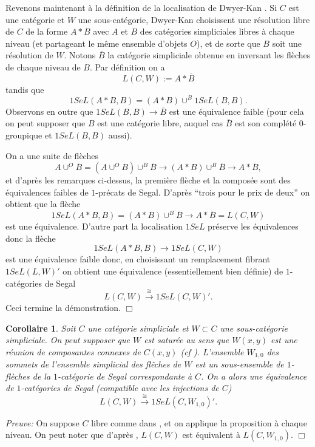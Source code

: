 \documentclass[12pt]{article}
\newcommand{\eop}{\hfill $\Box$\vspace{.1in}}
\newtheorem{corollaire}[lemma]{Corollaire}
\begin{document}
Revenons maintenant \`a la d\'efinition de la localisation de Dwyer-Kan
\cite{DwyerKan1}. Si $C$ est une cat\'egorie et $W$ une sous-cat\'egorie,
Dwyer-Kan choisissent une r\'esolution libre de $C$ de la forme
$A\ast B$ avec $A$ et $B$ des cat\'egories simpliciales libres \`a
chaque niveau
(et partageant le m\^eme ensemble d'objets $O$),
et de sorte que $B$ soit une r\'esolution de $W$. Notons $\overline{B}$
la cat\'egorie simpliciale obtenue en inversant les fl\`eches de chaque
niveau
de $B$. Par d\'efinition on a
$$
L(C,W):= A\ast \overline{B}
$$
tandis que
$$
1SeL(A\ast B, B)= (A\ast B)\cup ^{B}1SeL(B,B).
$$
Observons en outre que $1SeL(B,B)\rightarrow \overline{B}$ est une \'equivalence
faible (pour cela on peut supposer que $B$ est une cat\'egorie libre, auquel cas
$\overline{B}$ est son compl\'et\'e $0$-groupique et $1SeL(B,B)$ aussi).

On
a une suite de fl\`eches $$
A\cup ^O \overline{B} = (A\cup ^OB)\cup ^B\overline{B}\rightarrow
(A\ast B)\cup ^{B}\overline{B}\rightarrow A\ast \overline{B},
$$
et d'apr\`es les remarques ci-dessus,
la premi\`ere fl\`eche et la compos\'ee sont
des \'equivalences faibles de $1$-pr\'ecats de Segal. D'apr\`es
``trois pour le prix de
deux'' on obtient que la fl\`eche
$$
1SeL(A\ast B, B)= (A\ast B)\cup ^{B}\overline{B}\rightarrow A\ast
\overline{B}=L(C,W)
$$
est une \'equivalence. D'autre part la localisation $1SeL$
pr\'eserve les \'equivalences donc la fl\`eche
$$
1SeL(A\ast B, B)\rightarrow 1SeL(C,W)
$$
est une \'equivalence faible donc, en choisissant un remplacement fibrant
$1SeL(L,W)'$ on obtient une \'equivalence (essentiellement bien d\'efinie)
de $1$-cat\'egories de Segal
$$
L(C,W)\stackrel{\cong}{\rightarrow} 1SeL(C,W)'.
$$
Ceci termine la d\'emonstration.
\eop


\begin{corollaire}
\label{dklocseglocspl}
Soit $C$ une cat\'egorie simpliciale et $W\subset C$ une sous-cat\'egorie
simpliciale. On peut supposer que $W$ est satur\'ee au sens que $W(x,y)$ est
une r\'eunion de composantes connexes de $C(x,y)$ (cf \cite{DwyerKan1}).
L'ensemble $W_{1,0}$ des sommets
de l'ensemble simplicial des fl\^eches de $W$ est un sous-ensemble de
$1$-fl\`eches de la $1$-cat\'egorie de Segal correspondante \`a $C$. On a alors
une
\'equivalence de $1$-cat\'egories de Segal (compatible avec les injections de
$C$)
$$
L(C,W) \stackrel{\cong}{\rightarrow} 1SeL(C,W_{1,0})'.
$$
\end{corollaire}
{\em Preuve:}
On suppose $C$ libre comme dans \cite{DwyerKan1}, et on applique la
proposition \`a
chaque niveau. On peut noter que d'apr\`es \cite{DwyerKan1}, $L(C,W)$ est
\'equivalent \`a $L(C, W_{1,0})$.
\eop
\end{document}

